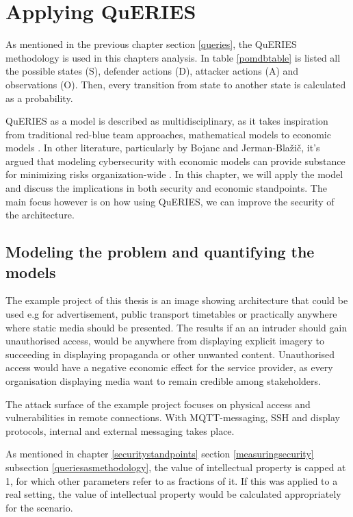 \chapter{Applying QuERIES} \label{analysis}

As mentioned in the previous chapter section \ref{queries}, the
QuERIES methodology is used in this chapters analysis. In
table \ref{pomdbtable} is listed all the possible states (S), defender
actions (D), attacker actions (A) and observations (O). Then, every
transition from state to another state is calculated as a probability.

QuERIES as a model is described as multidisciplinary, as it takes
inspiration from traditional red-blue team approaches, mathematical
models to economic models \cite{hughes2013quantitative}. In other
literature, particularly by Bojanc and Jerman-Blažič, it's argued that
modeling cybersecurity with economic models can provide substance for
minimizing risks organization-wide \cite{jerman2008economic}. In this
chapter, we will apply the model and discuss the implications in both
security and economic standpoints. The main focus however is on how
using QuERIES, we can improve the security of the architecture.

\section{Modeling the problem and quantifying the models} \label{modprob}

The example project of this thesis is an image showing architecture that
could be used e.g for advertisement, public transport timetables or
practically anywhere where static media should be presented. The
results if an an intruder should gain unauthorised access, would be
anywhere from displaying explicit imagery to succeeding in displaying
propaganda or other unwanted content. Unauthorised access would have a
negative economic effect for the service provider, as every
organisation displaying media want to remain credible among
stakeholders.

The attack surface of the example project focuses on physical access
and vulnerabilities in remote connections. With MQTT-messaging, SSH
and display protocols, internal and external messaging takes place.

As mentioned in chapter \ref{securitystandpoints} section
\ref{measuringsecurity} subsection \ref{queriesasmethodology}, the
value of intellectual property is capped at 1, for which other
parameters refer to as fractions of it. If this was applied to a real
setting, the value of intellectual property would be calculated
appropriately for the scenario.

